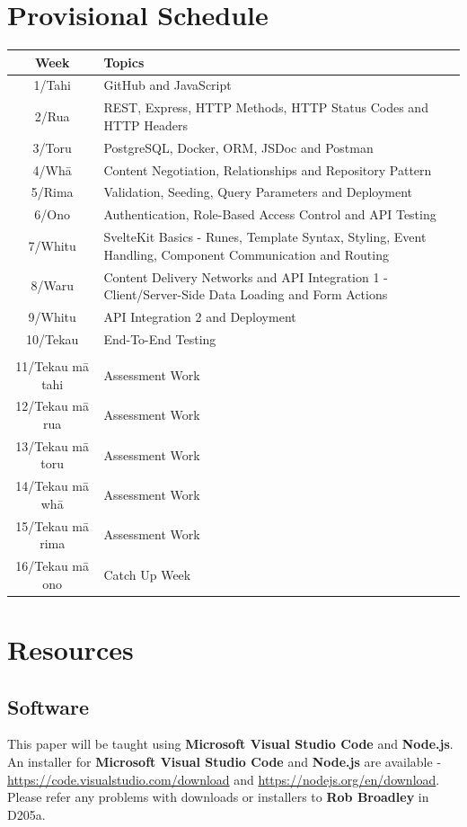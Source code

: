 \documentclass{article}
\begin{document}
\section*{Provisional Schedule}
\renewcommand{\arraystretch}{1.5}
\begin{tabular}{|c|p{12cm}|}
	\hline
	\textbf{Week} & \textbf{Topics} \\ \hline
	1/Tahi & GitHub and JavaScript \\ \hline
	2/Rua & REST, Express, HTTP Methods, HTTP Status Codes and HTTP Headers \\ \hline
	3/Toru & PostgreSQL, Docker, ORM, JSDoc and Postman \\ \hline 
	4/Whā & Content Negotiation, Relationships and Repository Pattern \\ \hline
	5/Rima & Validation, Seeding, Query Parameters and Deployment \\ \hline
	6/Ono & Authentication, Role-Based Access Control and API Testing \\ \hline
	7/Whitu & SvelteKit Basics - Runes, Template Syntax, Styling, Event Handling, Component Communication and Routing \\ \hline
	8/Waru & Content Delivery Networks and API Integration 1 - Client/Server-Side Data Loading and Form Actions \\ \hline
	9/Whitu & API Integration 2 and Deployment \\ \hline
	10/Tekau & End-To-End Testing \\ \hline
	\rowcolor{yellow} \multicolumn{2}{|c|}{Mid Semester Break} \\ \hline
	11/Tekau mā tahi & Assessment Work \\ \hline
	12/Tekau mā rua & Assessment Work \\ \hline
	13/Tekau mā toru & Assessment Work \\ \hline
	14/Tekau mā whā & Assessment Work \\ \hline 
	15/Tekau mā rima & Assessment Work \\ \hline
	16/Tekau mā ono & Catch Up Week \\ \hline
\end{tabular}

\section*{Resources}

\subsection*{Software}
This paper will be taught using \textbf{Microsoft Visual Studio Code} and \textbf{Node.js}. An installer for \textbf{Microsoft Visual Studio Code} and \textbf{Node.js} are available - \href{https://code.visualstudio.com/download}{https://code.visualstudio.com/download} and \href{https://nodejs.org/en/download}{https://nodejs.org/en/download}. Please refer any problems with downloads or installers to \textbf{Rob Broadley} in D205a.
\end{document}
